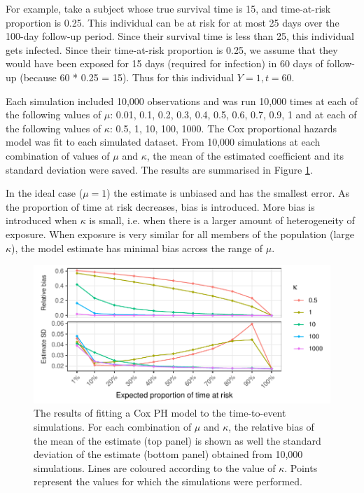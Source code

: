 For example, take a subject whose true survival time is 15, and time-at-risk proportion is 0.25. This individual can be at risk for at most 25 days over the 100-day follow-up period. Since their survival time is less than 25, this individual gets infected. Since their time-at-risk proportion is 0.25, we assume that they would have been exposed for 15 days (required for infection) in 60 days of follow-up (because 60 * 0.25 = 15). Thus for this individual $Y=1, t=60$.

Each simulation included 10,000 observations and was run 10,000 times at each of the following values of $\mu$: 0.01, 0.1, 0.2, 0.3, 0.4, 0.5, 0.6, 0.7, 0.9, 1 and at each of the following values of $\kappa$: 0.5, 1, 10, 100, 1000. The Cox proportional hazards model was fit to each simulated dataset. From 10,000 simulations at each combination of values of $\mu$ and $\kappa$, the mean of the estimated coefficient and its standard deviation were saved. The results are summarised in Figure \ref{CoxSimResults}.

In the ideal case ($\mu = 1$) the estimate is unbiased and has the smallest error. As the proportion of time at risk decreases, bias is introduced. More bias is introduced when $\kappa$ is small, i.e. when there is a larger amount of heterogeneity of exposure. When exposure is very similar for all members of the population (large $\kappa$), the model estimate has minimal bias across the range of $\mu$.

\begin{figure}[htp]
	\centering
	\includegraphics[width=1\textwidth]{../cox-tarprop-plot/risk.pdf}
	\caption{
		The results of fitting a Cox PH model to the time-to-event simulations. For each combination of $\mu$ and $\kappa$, the relative bias of the mean of the estimate (top panel) is shown as well the standard deviation of the estimate (bottom panel) obtained from 10,000 simulations. Lines are coloured according to the value of $\kappa$. Points represent the values for which the simulations were performed.
	}
	\label{CoxSimResults}
\end{figure}

